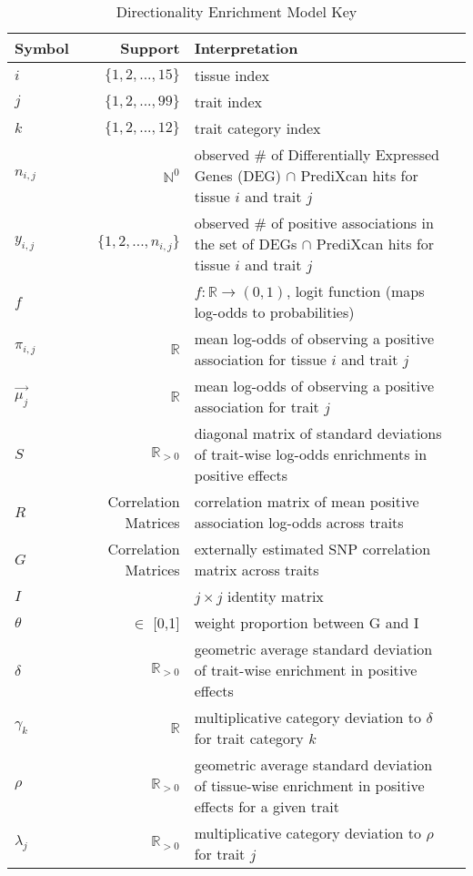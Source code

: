 \documentclass{article}
\numberwithin{equation}{section}
\begin{document}
\begin{table}[htbp]
\caption{Directionality Enrichment Model Key}
\centering
\begin{tabular}{l r p{12cm}r}
\toprule 
Symbol & Support & Interpretation \\
\midrule
$i$ & $\{1,2,...,15\}$ & tissue index  \\
$j$ & $\{1,2,...,99\}$ & trait index  \\
$k$ & $\{1,2,...,12\}$ & trait category index  \\
$n_{i,j}$ & $\mathbb{N}^0$ & observed \# of Differentially Expressed Genes (DEG) $\cap$ PrediXcan hits for tissue $i$ and trait $j$\\
$y_{i,j}$ & $\{1,2,...,n_{i,j}\}$ & observed \# of positive associations in the set of DEGs $\cap$ PrediXcan hits for tissue $i$ and trait $j$\\
$f$ & & $f: \mathbb{R} \rightarrow (0, 1)$, logit function (maps log-odds to probabilities)  \\
$\pi_{i,j}$ & $\mathbb{R}$ & mean log-odds of observing a positive association for tissue $i$ and trait $j$\\
$\vec{\mu_j}$ & $\mathbb{R}$ & mean log-odds of observing a positive association for trait $j$\\
$S$ & $\mathbb{R}_{>0}$ & diagonal matrix of standard deviations of trait-wise log-odds enrichments in positive effects\\
$R$ & Correlation Matrices & correlation matrix of mean positive association log-odds across traits\\
$G$ & Correlation Matrices & externally estimated SNP correlation matrix across traits\\
$I$ & & $j \times j$ identity matrix\\
$\theta$ & $\in$ [0,1] & weight proportion between G and I\\
$\delta$ & $\mathbb{R}_{>0}$ & geometric average standard deviation of trait-wise enrichment in positive effects\\
$\gamma_k$ & $\mathbb{R}$ & multiplicative category deviation to $\delta$ for trait category $k$\\
$\rho$ & $\mathbb{R}_{>0}$ & geometric average standard deviation of tissue-wise enrichment in positive effects for a given trait\\
$\lambda_j$ & $\mathbb{R}_{>0}$ & multiplicative category deviation to $\rho$ for trait $j$\\
\bottomrule
\end{tabular}
\end{table}
\end{document}
